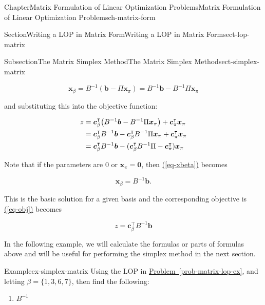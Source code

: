 \documentclass[oneside,10pt,]{book}
\newcommand{\xreffont}{\relax}
\numberwithin{equation}{section}
\newcommand{\amp}{&}
\begin{document}
\begin{chapterptx}{Chapter}{Matrix Formulation of Linear Optimization Problems}{}{Matrix Formulation of Linear Optimization Problems}{}{}{ch-matrix-form}
\begin{sectionptx}{Section}{Writing a LOP in Matrix Form}{}{Writing a LOP in Matrix Form}{}{}{sect-lop-matrix}
\begin{subsectionptx}{Subsection}{The Matrix Simplex Method}{}{The Matrix Simplex Method}{}{}{sect-simplex-matrix}
\par
%
\begin{equation}
\boldsymbol{x}_{\beta}  = B^{-1} (\boldsymbol{b}- \Pi \boldsymbol{x}_{\pi}) = B^{-1} \boldsymbol{b} - B^{-1} \Pi \boldsymbol{x}_{\pi}\label{eq-xbeta}
\end{equation}
%
\par
and substituting this into the objective function:%
\par
%
\begin{align}
z \amp = \boldsymbol{c}_{\beta}^{\intercal} \bigl( B^{-1} \boldsymbol{b} - B^{-1} \Pi \boldsymbol{x}_{\pi} \bigr)+ \boldsymbol{c}_{\pi}^{\intercal} \boldsymbol{x}_{\pi}  \notag\\
\amp = \boldsymbol{c}_{\beta}^{\intercal} B^{-1} \boldsymbol{b} - \boldsymbol{c}_{\beta}^{\intercal} B^{-1} \Pi \boldsymbol{x}_{\pi} + \boldsymbol{c}_{\pi}^{\intercal} \boldsymbol{x}_{\pi}  \notag\\
\amp = \boldsymbol{c}_{\beta}^{\intercal} B^{-1} \boldsymbol{b} - (\boldsymbol{c}_{\beta}^{\intercal} B^{-1} \Pi - \boldsymbol{c}_{\pi}^{\intercal}) \boldsymbol{x}_{\pi} \label{eq-obj}
\end{align}
%
\par
Note that if the parameters are 0 or \(\boldsymbol{x}_{\pi}=\boldsymbol{0}\), then \hyperref[eq-xbeta]{({\xreffont\ref{eq-xbeta}})} becomes%
\par
%
\begin{equation}
\boldsymbol{x}_{\beta} = B^{-1} \boldsymbol{b}.\label{eq-xbeta-basic}
\end{equation}
%
\par
This is the basic solution for a given basis and the corresponding objective is \hyperref[eq-obj]{({\xreffont\ref{eq-obj}})} becomes%
\par
%
\begin{equation}
z  = \boldsymbol{c}_{\beta}^{\intercal} B^{-1} \boldsymbol{b}\label{eq-matrix-z}
\end{equation}
%
\par
In the following example, we will calculate the formulas or parts of formulas above and will be useful for performing the simplex method in the next section.%
\begin{example}{Example}{}{ex-simplex-matrix}%
Using the LOP in \hyperref[prob-matrix-lop-ex]{Problem~{\xreffont\ref{prob-matrix-lop-ex}}}, and letting \(\beta=\{1,3,6,7\}\), then find the following:%
\par
%
\begin{enumerate}
\item{}\(\displaystyle B^{-1}\)%

\end{enumerate}
\end{example}
\end{subsectionptx}
\end{sectionptx}
\end{chapterptx}
\end{document}
